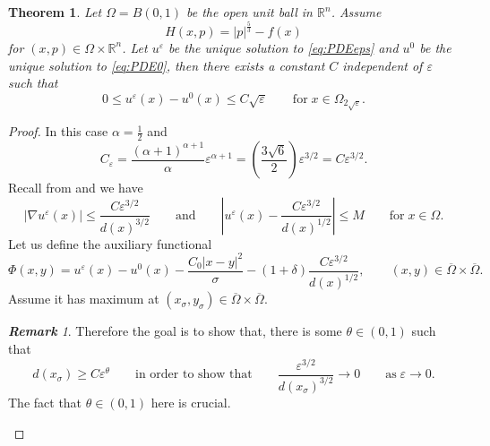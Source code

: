 \documentclass[11pt,reqno]{amsart}
\numberwithin{figure}{section}
\theoremstyle{plain}
\newtheorem{thm}{Theorem}[section]
\theoremstyle{remark}
\newtheorem{rem}{\bf{Remark}}
\numberwithin{equation}{section}
\begin{document}
\begin{thm}\label{thm:rate_doubling1} Let $\Omega = B(0,1)$ be the open unit ball in $\mathbb{R}^n$. Assume
\begin{equation*}
    H(x,p) = |p|^{\frac{5}{3}} - f(x)
\end{equation*}
for $(x,p)\in \Omega\times\mathbb{R}^n$. Let $u^\varepsilon$ be the unique solution to \eqref{eq:PDEeps} and $u^0$ be the unique solution to \eqref{eq:PDE0}, then there exists a constant $C$ independent of $\varepsilon$ such that
\begin{equation*}
    0\leq u^\varepsilon(x) - u^0(x) \leq C\sqrt{\varepsilon} \qquad\text{for}\;x\in \Omega_{2\sqrt{\varepsilon}}.
\end{equation*}
\end{thm}
\begin{proof} In this case $\alpha = \frac{1}{2}$ and 
\begin{equation*}
    C_\varepsilon = \frac{(\alpha+1)^{\alpha+1}}{\alpha}\varepsilon^{\alpha+1} = \left(\frac{3\sqrt{6}}{2}\right)\varepsilon^{3/2} = C\varepsilon^{3/2}.
\end{equation*}
Recall from \cite{alessio_asymptotic_2006} and \cite{Lasry1989} we have
\begin{equation*}
|\nabla u^\varepsilon(x)|  \leq \frac{C\varepsilon^{3/2}}{d(x)^{3/2}} \qquad\text{and}\qquad \left|u^\varepsilon(x) - \frac{C\varepsilon^{3/2}}{d(x)^{1/2}}\right|\leq M\qquad\text{for}\;x\in \Omega.
\end{equation*}
Let us define the auxiliary functional
\begin{equation*}
    \Phi(x,y) = u^\varepsilon(x) - u^0(x) -\frac{C_0|x-y|^2}{\sigma} - \left(1+\delta\right) \frac{C\varepsilon^{3/2}}{d(x)^{1/2}}, \qquad (x,y)\in \overline{\Omega}\times \overline{\Omega}.
\end{equation*}
Assume it has maximum at $(x_\sigma,y_\sigma)\in \overline{\Omega}\times \overline{\Omega}$. 

\begin{rem} \color{blue} Therefore the goal is to show that, there is some $\theta\in (0,1)$ such that
\begin{equation*}
    d(x_\sigma)\geq C\varepsilon^\theta \qquad\text{in order to show that}\qquad \frac{\varepsilon^{3/2}}{d(x_\sigma)^{3/2}} \rightarrow 0 \qquad\text{as}\;\varepsilon\to 0.
\end{equation*}
The fact that $\theta \in (0,1)$ here is crucial.
\color{black}
\end{rem}
\noindent 


\end{proof}
\end{document}
